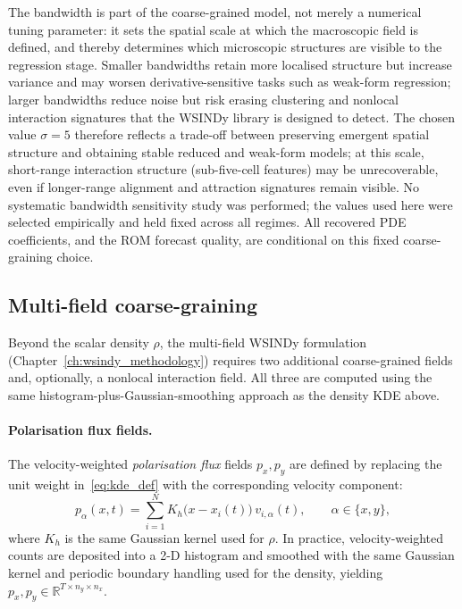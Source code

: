 The bandwidth is part of the coarse-grained model, not
merely a numerical tuning parameter: it sets the spatial scale at which
the macroscopic field is defined, and thereby determines which
microscopic structures are visible to the regression stage.  Smaller
bandwidths retain more localised structure but increase variance and may
worsen derivative-sensitive tasks such as weak-form regression; larger
bandwidths reduce noise but risk erasing clustering and nonlocal
interaction signatures that the WSINDy library is designed to detect.
The chosen value $\sigma=5$ therefore
reflects a trade-off between preserving emergent spatial structure and
obtaining stable reduced and weak-form models; at this scale, short-range interaction structure (sub-five-cell features) may be unrecoverable, even if longer-range alignment and attraction signatures remain visible.  No systematic bandwidth
sensitivity study was performed; the values used here were selected
empirically and held fixed across all regimes.  All recovered PDE
coefficients, and the ROM forecast quality, are conditional on this
fixed coarse-graining choice.

\subsection{Multi-field coarse-graining}
\label{sec:multifield_cg}

Beyond the scalar density $\rho$, the multi-field WSINDy formulation (Chapter~\ref{ch:wsindy_methodology}) requires
two additional coarse-grained fields and, optionally, a nonlocal interaction field.
All three are computed using the same
histogram-plus-Gaussian-smoothing approach as the density KDE above.

\paragraph{Polarisation flux fields.}
The velocity-weighted \emph{polarisation flux} fields $p_x,p_y$
are defined by replacing the unit weight in~\eqref{eq:kde_def} with the
corresponding velocity component:
\begin{equation}
p_\alpha(x,t)
=
\sum_{i=1}^N K_h\!\bigl(x-x_i(t)\bigr)\,v_{i,\alpha}(t),
\qquad \alpha\in\{x,y\},
\label{eq:flux_kde}
\end{equation}
where $K_h$ is the same Gaussian kernel used for $\rho$.
In practice, velocity-weighted counts are deposited
into a 2-D histogram and smoothed with the same Gaussian kernel and
periodic boundary handling used for the density, yielding
$p_x,p_y\in\mathbb{R}^{T\times n_y\times n_x}$.

